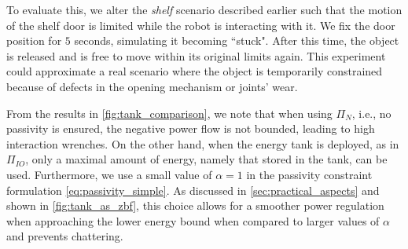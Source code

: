 To evaluate this, we alter the \emph{shelf} scenario described earlier such that the motion of the shelf door is limited while the robot is interacting with it. We fix the door position for $5$ seconds, simulating it becoming ``stuck". After this time, the object is released and is free to move within its original limits again. This experiment could approximate a real scenario where the object is temporarily constrained because of defects in the opening mechanism or joints' wear.

From the results in \fig \ref{fig:tank_comparison}, we note that when using $\Pi_{N}$, i.e., no passivity is ensured, the negative power flow is not bounded, leading to high interaction wrenches. On the other hand, when the energy tank is deployed, as in $\Pi_{IO}$, only a maximal amount of energy, namely that stored in the tank, can be used. Furthermore, we use a small value of $\alpha=1$ in the passivity constraint formulation \eqref{eq:passivity_simple}. As discussed in \sect \ref{sec:practical_aspects} and shown in \fig \ref{fig:tank_as_zbf}, this choice allows for a smoother power regulation when approaching the lower energy bound when compared to larger values of $\alpha$ and prevents chattering. 

